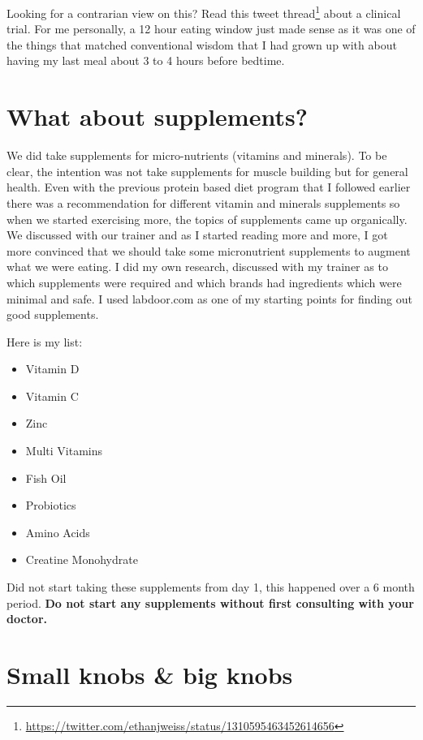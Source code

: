 \documentclass[
  oneside]{book}
\DeclareRobustCommand{\href}[2]{#2\footnote{\url{#1}}}
\providecommand{\tightlist}{%
  \setlength{\itemsep}{0pt}\setlength{\parskip}{0pt}}
\begin{document}
Looking for a contrarian view on this? Read this \href{https://twitter.com/ethanjweiss/status/1310595463452614656}{tweet thread} about a clinical trial. For me personally, a 12 hour eating window just made sense as it was one of the things that matched conventional wisdom that I had grown up with about having my last meal about 3 to 4 hours before bedtime.

\hypertarget{what-about-supplements}{%
\section{What about supplements?}\label{what-about-supplements}}

We did take supplements for micro-nutrients (vitamins and minerals). To be clear, the intention was not take supplements for muscle building but for general health. Even with the previous protein based diet program that I followed earlier there was a recommendation for different vitamin and minerals supplements so when we started exercising more, the topics of supplements came up organically. We discussed with our trainer and as I started reading more and more, I got more convinced that we should take some micronutrient supplements to augment what we were eating. I did my own research, discussed with my trainer as to which supplements were required and which brands had ingredients which were minimal and safe. I used labdoor.com as one of my starting points for finding out good supplements.

Here is my list:

\begin{itemize}
\tightlist
\item
  Vitamin D
\item
  Vitamin C
\item
  Zinc
\item
  Multi Vitamins
\item
  Fish Oil
\item
  Probiotics
\item
  Amino Acids
\item
  Creatine Monohydrate
\end{itemize}

Did not start taking these supplements from day 1, this happened over a 6 month period. \textbf{Do not start any supplements without first consulting with your doctor.}

\hypertarget{small-knobs-big-knobs}{%
\section{Small knobs \& big knobs}\label{small-knobs-big-knobs}}
\end{document}
